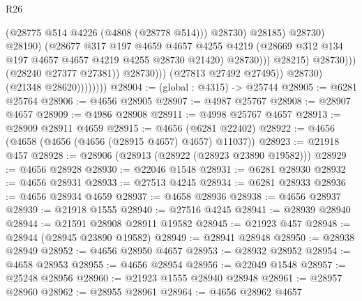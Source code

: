 \begin{lexlean}{R26}
\begin{coremodule}
                                                  (@28775 @514 @4226 (@4808 (@28778 @514)))
                                                  @28730)
                                                @28185)
                                              @28730)
                                            @28190)
                                          (@28677
                                            @317
                                            @197
                                            @4659
                                            @4657
                                            @4255
                                            @4219
                                            (@28669
                                              @312
                                              @134
                                              @197
                                              @4657
                                              @4657
                                              @4219
                                              @4255
                                              @28730
                                              @21420)
                                            @28730)))
                                      @28215)
                                    @28730)))
                              (@28240 @27377 @27381))
                            @28730)))
                      (@27813 @27492 @27495))
                    @28730)
                  (@21348 @28620))))))))
@28904 := (global : @4315) -> @25744
@28905 := @6281 @25764
@28906 := @4656 @28905
@28907 := @4987 @25767
@28908 := @28907 @4657
@28909 := @4986 @28908
@28911 := @4998 @25767 @4657
@28913 := @28909 @28911 @4659
@28915 := @4656 (@6281 @22402)
@28922 := @4656 (@4658 (@4656 (@4656 (@28915 @4657) @4657) @11037))
@28923 := @21918 @457
@28928 := @28906 (@28913 (@28922 (@28923 @23890 @19582)))
@28929 := @4656 @28928
@28930 := @22046 @1548
@28931 := @6281 @28930
@28932 := @4656 @28931
@28933 := @27513 @4245
@28934 := @6281 @28933
@28936 := @4656 @28934 @4659
@28937 := @4658 @28936
@28938 := @4656 @28937
@28939 := @21918 @1555
@28940 := @27516 @4245
@28941 := @28939 @28940
@28944 := @21591 @28908 @28911 @19582
@28945 := @21923 @457
@28948 := @28944 (@28945 @23890 @19582)
@28949 := @28941 @28948
@28950 := @28938 @28949
@28952 := @4656 @28950 @4657
@28953 := @28932 @28952
@28954 := @4658 @28953
@28955 := @4656 @28954
@28956 := @22049 @1548
@28957 := @25248 @28956
@28960 := @21923 @1555 @28940 @28948
@28961 := @28957 @28960
@28962 := @28955 @28961
@28964 := @4656 @28962 @4657

\end{coremodule}
\end{lexlean}
